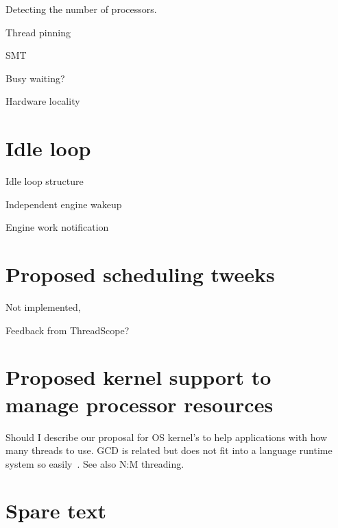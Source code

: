 Detecting the number of processors.

Thread pinning

SMT

Busy waiting?

Hardware locality

\section{Idle loop}
\label{sec:idle_loop}

Idle loop structure

Independent engine wakeup

Engine work notification

\section{Proposed scheduling tweeks}
\label{sec:proposed_tweeks}

Not implemented,

Feedback from ThreadScope?

\section{Proposed kernel support to manage processor resources}
\label{sec:kernel_scheduling_help}


Should I describe our proposal for OS kernel's to help
applications with how many threads to use.
GCD is related but does not fit into a language runtime system so
easily~\cite{apple_gcd}.
See also N:M threading.

\section{Spare text}


%
%

